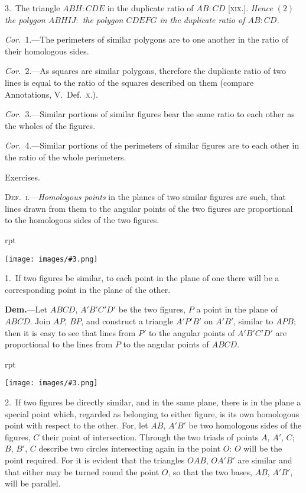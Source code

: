 \documentclass[oneside]{book}
\newcounter{wrapwidth}
\newcommand\exhead[1]{
\Needspace*{5\baselineskip}\begin{center}
\textsf{#1}
\end{center}
}
\newcommand\imgflow[3]{
\setcounter{wrapwidth}{#1}
\begin{wrapfigure}[#2]{r}{\value{wrapwidth}pt}
\begin{center}
\vspace{-0.3in}
\texttt{[image: images/\#3.png]}
\end{center}
\end{wrapfigure}
}
\begin{document}
3.~The triangle $ABH : CDE$ in the duplicate ratio of
$AB : CD$ [\textsc{xix.}]. \emph{Hence $(2)$ the polygon $ABHIJ :$ the
polygon $CDEFG$ in the duplicate ratio of $AB : CD$.}

\emph{Cor.}~1.---The perimeters of similar polygons are to
one another in the ratio of their homologous sides.

\emph{Cor.}~2.---As squares are similar polygons, therefore
the duplicate ratio of two lines is equal to the ratio of
the squares described on them (compare Annotations,
V.~Def.~\textsc{x.}).

\emph{Cor.}~3.---Similar portions of similar figures bear the
same ratio to each other as the wholes of the figures.

\emph{Cor.}~4.---Similar portions of the perimeters of similar
figures are to each other in the ratio of the whole perimeters.


\exhead{Exercises.}

\textsc{Def.~i.}---\emph{Homologous points} in the planes of two
similar figures are such, that lines drawn from them
to the angular points of the two figures are proportional
to the homologous sides of the two figures.

\smallskip
\imgflow{190}{11}{f199}

\begin{footnotesize}
1.~If two figures be similar, to each point in the plane of one
there will be a corresponding
point in the
plane of the other.

\textbf{Dem.}---Let $ABCD$,
$A'B'C'D'$ be the two
figures, $P$ a point in
the plane of $ABCD$.
Join $AP$, $BP$, and construct
a triangle $A'P'B'$
on $A'B'$, similar to
$APB$; then it is easy to see that lines from $P'$ to the angular
points of $A'B'C'D'$ are proportional to the lines from $P$ to the
angular points of $ABCD$.

\imgflow{170}{12}{f200}

2.~If two figures be directly similar, and in the same plane,
there is in the plane a special point which, regarded as belonging
to either figure, is its own
homologous point with respect
to the other. For,
let $AB$, $A'B'$ be two homologous
sides of the figures,
$C$ their point of intersection.
Through the two triads of
points $A$, $A'$, $C$; $B$, $B'$, $C$
describe two circles intersecting
again in the point
$O$: $O$ will be the point required.
For it is evident
that the triangles $OAB$, $OA'B'$ are similar and that either may
be turned round the point $O$, so that the two bases, $AB$, $A'B'$,
will be parallel.
\par\end{footnotesize}
\end{document}
